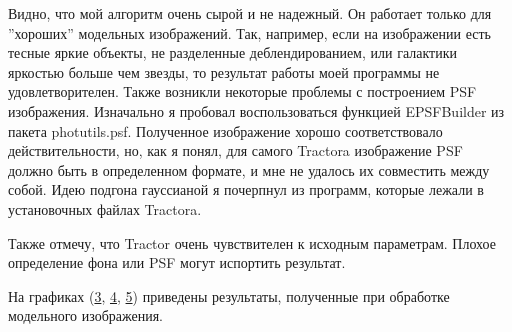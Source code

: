 \documentclass[12pt,a4paper]{article}
\begin{document}
Видно, что мой алгоритм очень сырой и не надежный. Он работает только для ''хороших'' модельных изображений. Так, например, если на изображении есть тесные яркие объекты, не разделенные деблендированием, или галактики яркостью больше чем звезды, то результат работы моей программы не удовлетворителен. Также возникли некоторые проблемы с построением PSF изображения. Изначально я пробовал воспользоваться функцией EPSFBuilder из пакета photutils.psf. Полученное изображение хорошо соответствовало действительности, но, как я понял, для самого Tractora изображение PSF должно быть в определенном формате, и мне не удалось их совместить между собой. Идею подгона гауссианой я почерпнул из программ, которые лежали в установочных файлах Tractora. 

Также отмечу, что Tractor очень чувствителен к исходным параметрам. Плохое определение фона или PSF могут испортить результат.
 
На графиках (\hyperref[pic3]{3}, \hyperref[pic4]{4}, \hyperref[pic5]{5}) приведены результаты, полученные при обработке модельного изображения. 
\end{document}
